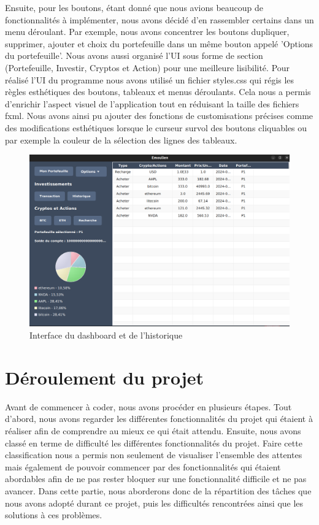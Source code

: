 \documentclass[12pt]{article}
\begin{document}
Ensuite, pour les boutons, étant donné que nous avions beaucoup de fonctionnalités à implémenter, nous avons décidé d'en rassembler certains dans un menu déroulant. Par exemple, nous avons concentrer les boutons dupliquer, supprimer, ajouter et choix du portefeuille dans un même bouton appelé 'Options du portefeuille'. Nous avons aussi organisé l'UI sous forme de section (Portefeuille, Investir, Cryptos et Action) pour une meilleure lisibilité. Pour réalisé l'UI du programme nous avons utilisé un fichier styles.css qui régis les règles esthétiques des boutons, tableaux et menus déroulants. Cela nous a permis d'enrichir l'aspect visuel de l'application tout en réduisant la taille des fichiers fxml. Nous avons ainsi pu ajouter des fonctions de customisations précises comme des modifications esthétiques lorsque le curseur survol des boutons cliquables ou par exemple la couleur de la sélection des lignes des tableaux.


\begin{figure}[H]
    \centering
    \includegraphics[width=0.75\linewidth]{dash1.png}
    \caption{Interface du dashboard et de l'historique}
    \label{fig:enter-label}
\end{figure}

\newpage
\section{Déroulement du projet}
Avant de commencer à coder, nous avons procéder en plusieurs étapes. Tout d'abord, nous avons regarder les différentes fonctionnalités du projet qui étaient à réaliser afin de comprendre au mieux ce qui était attendu. Ensuite, nous avons classé en terme de difficulté les différentes fonctionnalités du projet. Faire cette classification nous a permis non seulement de visualiser l'ensemble des attentes mais également de pouvoir commencer par des fonctionnalités qui étaient abordables afin de ne pas rester bloquer sur une fonctionnalité difficile et ne pas avancer. 
Dans cette partie, nous aborderons donc de la répartition des tâches que nous avons adopté durant ce projet, puis les difficultés rencontrées ainsi que les solutions à ces problèmes.
\end{document}
